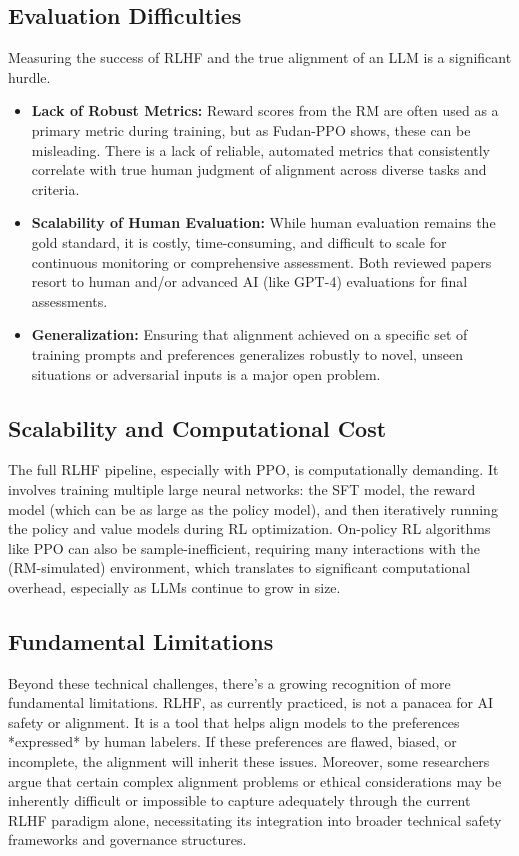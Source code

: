 \documentclass{article} %
\begin{document}
\subsection{Evaluation Difficulties}
Measuring the success of RLHF and the true alignment of an LLM is a significant hurdle.
\begin{itemize}
    \item \textbf{Lack of Robust Metrics:} Reward scores from the RM are often used as a primary metric during training, but as Fudan-PPO shows, these can be misleading. \cite{Zheng2023PPO} There is a lack of reliable, automated metrics that consistently correlate with true human judgment of alignment across diverse tasks and criteria. \cite{Zheng2023PPO}
    \item \textbf{Scalability of Human Evaluation:} While human evaluation remains the gold standard, it is costly, time-consuming, and difficult to scale for continuous monitoring or comprehensive assessment. \cite{Zheng2023PPO} Both reviewed papers resort to human and/or advanced AI (like GPT-4) evaluations for final assessments. \cite{Zheng2023PPO, Dai2023SafeRLHF}
    \item \textbf{Generalization:} Ensuring that alignment achieved on a specific set of training prompts and preferences generalizes robustly to novel, unseen situations or adversarial inputs is a major open problem.
\end{itemize}

\subsection{Scalability and Computational Cost}
The full RLHF pipeline, especially with PPO, is computationally demanding. It involves training multiple large neural networks: the SFT model, the reward model (which can be as large as the policy model), and then iteratively running the policy and value models during RL optimization. \cite{Zheng2023PPO} On-policy RL algorithms like PPO can also be sample-inefficient, requiring many interactions with the (RM-simulated) environment, which translates to significant computational overhead, especially as LLMs continue to grow in size. \cite{Tang2024AsyncRLHF}

\subsection{Fundamental Limitations}
Beyond these technical challenges, there's a growing recognition of more fundamental limitations. RLHF, as currently practiced, is not a panacea for AI safety or alignment. \cite{Casper2023OpenProblems, MontrealEthicsRLHFBlog} It is a tool that helps align models to the preferences *expressed* by human labelers. If these preferences are flawed, biased, or incomplete, the alignment will inherit these issues. Moreover, some researchers argue that certain complex alignment problems or ethical considerations may be inherently difficult or impossible to capture adequately through the current RLHF paradigm alone, necessitating its integration into broader technical safety frameworks and governance structures. \cite{Casper2023OpenProblems, MontrealEthicsRLHFBlog}
\end{document}
